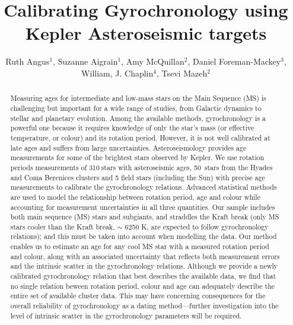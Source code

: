 \documentclass[10pt,preprint]{aastex}
\newcommand{\nastero}{310}
\newcommand{\nHC}{50~}
\begin{document}
\title{Calibrating Gyrochronology using Kepler Asteroseismic targets}

\author{Ruth Angus$^1$, Suzanne Aigrain$^1$, Amy McQuillan$^2$, Daniel Foreman-Mackey$^3$,  William, J. Chaplin$^4$, Tsevi Mazeh$^2$}

\begin{abstract}
\label{abs}

Measuring ages for intermediate and low-mass stars on the Main Sequence (MS) is challenging but important for a wide range of studies, from Galactic dynamics to stellar and planetary evolution.
Among the available methods, gyrochronology is a powerful one because it requires knowledge of only the star's mass (or effective temperature, or colour) and its rotation period.
However, it is not well calibrated at late ages and suffers from large uncertainties.
Asteroseismology provides age measurements for some of the brightest stars observed by Kepler.
We use rotation periods measurements of \nastero$~$stars with asteroseismic ages, \nHC stars from the Hyades and Coma Berenices clusters and 5 field stars (including the Sun) with precise age measurements to calibrate the gyrochronology relations.
Advanced statistical methods are used to model the relationship between rotation period, age and colour while accounting for measurement uncertainties in all three quantities.
Our sample includes both main sequence (MS) stars and subgiants, and straddles the Kraft break (only MS stars cooler than the Kraft break, $\sim$ 6250 K, are expected to follow gyrochronology relations); and this must be taken into account when modelling the data.
Our method enables us to estimate an age for any cool MS star with a measured rotation period and colour, along with an associated uncertainty that reflects both measurement errors and the intrinsic scatter in the gyrochronology relations.
Although we provide a newly calibrated gyrochronology relation that best describes the available data, we find that no single relation beween rotation period, colour and age can adequately describe the entire set of available cluster data.
This may have concerning consequences for the overall reliability of gyrochronology as a dating method---further investigation into the level of intrinsic scatter in the gyrochronology parameters will be required.

\end{abstract}
\end{document}
